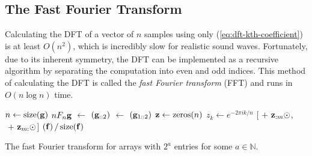 \subsection*{The Fast Fourier Transform} %

Calculating the DFT of a vector of $n$ samples using only (\ref{eq:dft-kth-coefficient}) is at least $O(n^2)$, which is incredibly slow for realistic sound waves.
Fortunately, due to its inherent symmetry, the DFT can be implemented as a recursive algorithm by separating the computation into even and odd indices.
This method of calculating the DFT is called the \emph{fast Fourier transform} (FFT) and runs in $O(n\log{n})$ time.

\begin{algorithm}[H]
\begin{algorithmic}[1]
        \State $n \gets \mathrm{size}(\mathbf{g})$
            \label{step:fft-base-case-a}
            \State {} $n F_n \mathbf{g}$
                \label{step:fft-base-case-b}
        \Else{}
            \State {} $\gets$ $(\mathbf{g}_{::2})$
            \State {} $\gets$ $(\mathbf{g}_{1::2})$
            \State $\z \gets\zeros{n}$
                \label{step:fft-loop-a}
                \State $z_k \gets e^{-2\pi i k / n}$
                    \label{step:fft-loop-b}
            \EndFor
            \State {} $[$$\ +\ \mathbf{z}_{:m} \odot $$,\ $$\ +\ \mathbf{z}_{m:} \odot $$]$
                \label{step:fft-concatenate}
        \EndIf
    \EndProcedure
    \State {} $(\mathbf{f})\,/\,\mathrm{size}(\mathbf{f})$
\EndProcedure
\end{algorithmic}
\caption{The fast Fourier transform for arrays with $2^a$ entries for some $a \in \mathbb{N}$.}
\label{alg:FFT}
\end{algorithm}

